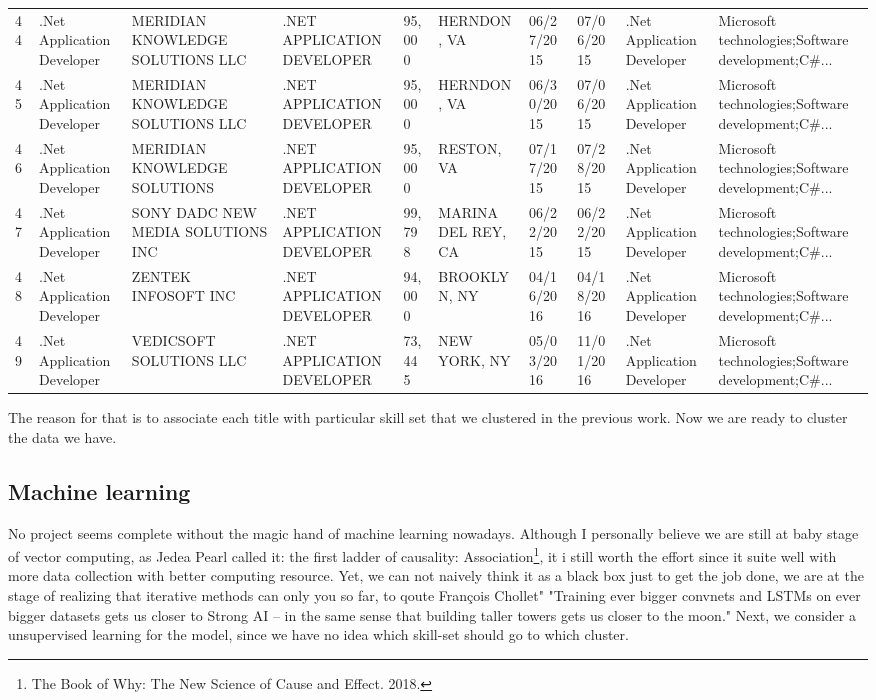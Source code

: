 \begin{table}[h!]
{\begin{tabular}{llllllllll}
	44 &  .Net Application Developer &                   MERIDIAN KNOWLEDGE SOLUTIONS LLC &  .NET APPLICATION DEVELOPER &      95,000 &         HERNDON, VA &  06/27/2015 &  07/06/2015 &  .Net Application Developer &  Microsoft technologies;Software development;C\#... \\
	45 &  .Net Application Developer &                   MERIDIAN KNOWLEDGE SOLUTIONS LLC &  .NET APPLICATION DEVELOPER &      95,000 &         HERNDON, VA &  06/30/2015 &  07/06/2015 &  .Net Application Developer &  Microsoft technologies;Software development;C\#... \\
	46 &  .Net Application Developer &                       MERIDIAN KNOWLEDGE SOLUTIONS &  .NET APPLICATION DEVELOPER &      95,000 &          RESTON, VA &  07/17/2015 &  07/28/2015 &  .Net Application Developer &  Microsoft technologies;Software development;C\#... \\
	47 &  .Net Application Developer &                  SONY DADC NEW MEDIA SOLUTIONS INC &  .NET APPLICATION DEVELOPER &      99,798 &  MARINA DEL REY, CA &  06/22/2015 &  06/22/2015 &  .Net Application Developer &  Microsoft technologies;Software development;C\#... \\
	48 &  .Net Application Developer &                                ZENTEK INFOSOFT INC &  .NET APPLICATION DEVELOPER &      94,000 &        BROOKLYN, NY &  04/16/2016 &  04/18/2016 &  .Net Application Developer &  Microsoft technologies;Software development;C\#... \\
	49 &  .Net Application Developer &                            VEDICSOFT SOLUTIONS LLC &  .NET APPLICATION DEVELOPER &      73,445 &        NEW YORK, NY &  05/03/2016 &  11/01/2016 &  .Net Application Developer &  Microsoft technologies;Software development;C\#... \\
	\hline
\end{tabular}
		
	}
	
\end{table}
The reason for that is to associate each title with particular skill set that we clustered in the previous work. Now we are ready to cluster the data we have.
\subsection{Machine learning}
No project seems complete without the magic hand of machine learning nowadays. Although I personally believe we are still at baby stage of vector computing, as Jedea Pearl called it: the first ladder of causality: Association\footnote{The Book of Why: The New Science of Cause and Effect. 2018.}, it i still worth the effort since it suite well with more data collection with better computing resource. Yet, we can not naively think it as a black box just to get the job done, we are at the stage of realizing that iterative methods can only you so far, to qoute François Chollet" "Training ever bigger convnets and LSTMs on ever bigger datasets gets us closer to Strong AI -- in the same sense that building taller towers gets us closer to the moon." Next, we consider a unsupervised learning for the model, since we have no idea which skill-set should go to which cluster.
